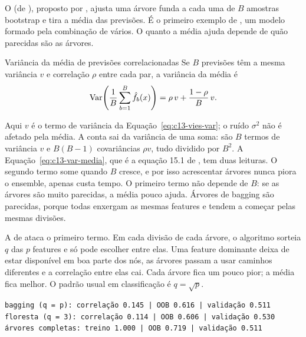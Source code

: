O  (de ), proposto por \citet{breiman1996}, ajusta uma árvore funda a cada uma de $B$ amostras bootstrap e tira a média das previsões. É o primeiro exemplo de , um modelo formado pela combinação de vários. O quanto a média ajuda depende de quão parecidas são as árvores.

\begin{resultado}{Variância da média de previsões correlacionadas}
Se $B$ previsões têm a mesma variância $v$ e correlação $\rho$ entre cada par, a variância da média é
\begin{equation}
  \operatorname{Var}\!\left(\frac{1}{B}\sum_{b=1}^{B} \hat f_b(x)\right) = \rho\,v + \frac{1-\rho}{B}\,v .
  \label{eq:c13-var-media}
\end{equation}
\end{resultado}

Aqui $v$ é o termo de variância da Equação~\eqref{eq:c13-vies-var}; o ruído $\sigma^2$ não é afetado pela média. A conta sai da variância de uma soma: são $B$ termos de variância $v$ e $B(B-1)$ covariâncias $\rho v$, tudo dividido por $B^2$. A Equação~\eqref{eq:c13-var-media}, que é a equação 15.1 de \citet{hastie2009}, tem duas leituras. O segundo termo some quando $B$ cresce, e por isso acrescentar árvores nunca piora o ensemble, apenas custa tempo. O primeiro termo não depende de $B$: se as árvores são muito parecidas, a média pouco ajuda. Árvores de bagging são parecidas, porque todas enxergam as mesmas features e tendem a começar pelas mesmas divisões.

A  de \citet{breiman2001} ataca o primeiro termo. Em cada divisão de cada árvore, o algoritmo sorteia $q$ das $p$ features e só pode escolher entre elas. Uma feature dominante deixa de estar disponível em boa parte dos nós, as árvores passam a usar caminhos diferentes e a correlação entre elas cai. Cada árvore fica um pouco pior; a média fica melhor. O padrão usual em classificação é $q = \sqrt{p}$.


\begin{lstlisting}[style=saida]
bagging (q = p): correlação 0.145 | OOB 0.616 | validação 0.511
floresta (q = 3): correlação 0.114 | OOB 0.606 | validação 0.530
árvores completas: treino 1.000 | OOB 0.719 | validação 0.511
\end{lstlisting}


